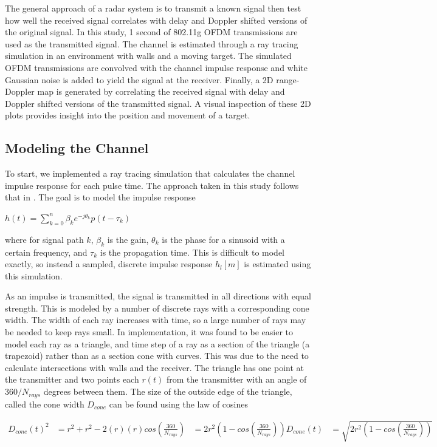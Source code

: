 \documentclass[article,11pt,onecolumn,final]{IEEEtran}
\begin{document}
The general approach of a radar system is to transmit a known signal then test how well the received signal correlates with delay and Doppler shifted versions of the original signal. In this study, 1 second of 802.11g OFDM transmissions are used as the transmitted signal. The channel is estimated through a ray tracing simulation in an environment with walls and a moving target. The simulated OFDM transmissions are convolved with the channel impulse response and white Gaussian noise is added to yield the signal at the receiver. Finally, a 2D range-Doppler map is generated by correlating the received signal with delay and Doppler shifted versions of the transmitted signal. A visual inspection of these 2D plots provides insight into the position and movement of a target.

\subsection{Modeling the Channel}

To start, we implemented a ray tracing simulation that calculates the channel impulse response for each pulse time. The approach taken in this study follows that in \cite{Holt}. The goal is to model the impulse response

$ h(t) = \sum_{k=0}^{n} \beta_k e^{-j \theta_k} p(t - \tau_k) $

where for signal path $k$, $\beta_k$ is the gain, $\theta_k$ is the phase for a sinusoid with a certain frequency, and $\tau_k$ is the propagation time. This is difficult to model exactly, so instead a sampled, discrete impulse response $h_l[m]$ is estimated using this simulation. 

As an impulse is transmitted, the signal is transmitted in all directions with equal strength. This is modeled by a number of discrete rays with a corresponding cone width. The width of each ray increases with time, so a large number of rays may be needed to keep rays small. In implementation, it was found to be easier to model each ray as a triangle, and time step of a ray as a section of the triangle (a trapezoid) rather than as a section cone with curves. This was due to the need to calculate intersections with walls and the receiver. The triangle has one point at the transmitter and two points each $r(t)$ from the transmitter with an angle of $360/N_{rays}$ degrees between them. The size of the outside edge of the triangle, called the cone width $D_{cone}$ can be found using the law of cosines

\begin{align*}
D_{cone}(t)^2 &= r^2 + r^2 - 2(r)(r)cos(\frac{360}{N_{rays}})
              &= 2r^2(1 - cos(\frac{360}{N_{rays}}))
D_{cone}(t) &= \sqrt{2r^2(1 - cos(\frac{360}{N_{rays}}))}
\end{align*}
\end{document}
